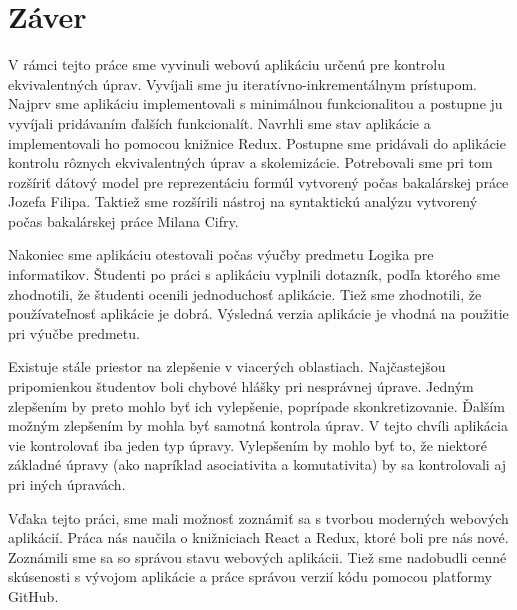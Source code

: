 \chapter*{Záver}  %

V rámci tejto práce sme vyvinuli webovú aplikáciu určenú pre kontrolu ekvivalentných úprav. Vyvíjali sme ju iteratívno-inkrementálnym prístupom. Najprv sme aplikáciu implementovali s minimálnou funkcionalitou a postupne ju vyvíjali pridávaním ďalších funkcionalít. Navrhli sme stav aplikácie a implementovali ho pomocou knižnice Redux. Postupne sme pridávali do aplikácie kontrolu rôznych ekvivalentných úprav a skolemizácie. Potrebovali sme pri tom rozšíriť dátový model pre reprezentáciu formúl vytvorený počas bakalárskej práce Jozefa Filipa. Taktiež sme rozšírili nástroj na syntaktickú analýzu vytvorený počas bakalárskej práce Milana Cifry.

Nakoniec sme aplikáciu otestovali počas výučby predmetu Logika pre informatikov. Študenti po práci s aplikáciu vyplnili dotazník, podľa ktorého sme zhodnotili, že študenti ocenili jednoduchosť aplikácie. Tiež sme zhodnotili, že používateľnosť aplikácie je dobrá. Výsledná verzia aplikácie je vhodná na použitie pri výučbe predmetu.

Existuje stále priestor na zlepšenie v viacerých oblastiach. Najčastejšou pripomienkou študentov boli chybové hlášky pri nesprávnej úprave. Jedným zlepšením by preto mohlo byť ich vylepšenie, poprípade skonkretizovanie. Ďalším možným zlepšením by mohla byť samotná kontrola úprav. V tejto chvíli aplikácia vie kontrolovať iba jeden typ úpravy. Vylepšením by mohlo byť to, že niektoré základné úpravy (ako napríklad asociativita a komutativita) by sa kontrolovali aj pri iných úpravách.

Vďaka tejto práci, sme mali možnosť zoznámiť sa s tvorbou moderných webových aplikácií. Práca nás naučila o knižniciach React a Redux, ktoré boli pre nás nové. Zoznámili sme sa so správou stavu webových aplikácii. Tiež sme nadobudli cenné skúsenosti s vývojom aplikácie a práce správou verzií kódu pomocou platformy GitHub.  